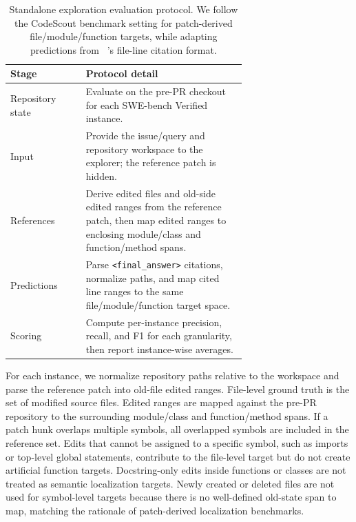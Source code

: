 \documentclass{llmxive}
\providecommand{\approach}{~}
\begin{document}
\begin{table}[t]
\centering
\small
\setlength{\tabcolsep}{4pt}
\begin{tabular}{lp{0.68\linewidth}}
\toprule
\textbf{Stage} & \textbf{Protocol detail} \\
\midrule
Repository state & Evaluate on the pre-PR checkout for each SWE-bench Verified instance. \\
Input & Provide the issue/query and repository workspace to the explorer; the reference patch is hidden. \\
References & Derive edited files and old-side edited ranges from the reference patch, then map edited ranges to enclosing module/class and function/method spans. \\
Predictions & Parse \texttt{<final\_answer>} citations, normalize paths, and map cited line ranges to the same file/module/function target space. \\
Scoring & Compute per-instance precision, recall, and F1 for each granularity, then report instance-wise averages. \\
\bottomrule
\end{tabular}
\caption{Standalone exploration evaluation protocol. We follow the CodeScout benchmark setting for patch-derived file/module/function targets, while adapting predictions from \approach's file-line citation format.}
\label{tab:explore-protocol}
\end{table}

For each instance, we normalize repository paths relative to the workspace and parse the reference patch into old-file edited ranges.
File-level ground truth is the set of modified source files.
Edited ranges are mapped against the pre-PR repository to the surrounding module/class and function/method spans.
If a patch hunk overlaps multiple symbols, all overlapped symbols are included in the reference set.
Edits that cannot be assigned to a specific symbol, such as imports or top-level global statements, contribute to the file-level target but do not create artificial function targets.
Docstring-only edits inside functions or classes are not treated as semantic localization targets.
Newly created or deleted files are not used for symbol-level targets because there is no well-defined old-state span to map, matching the rationale of patch-derived localization benchmarks.
\end{document}
